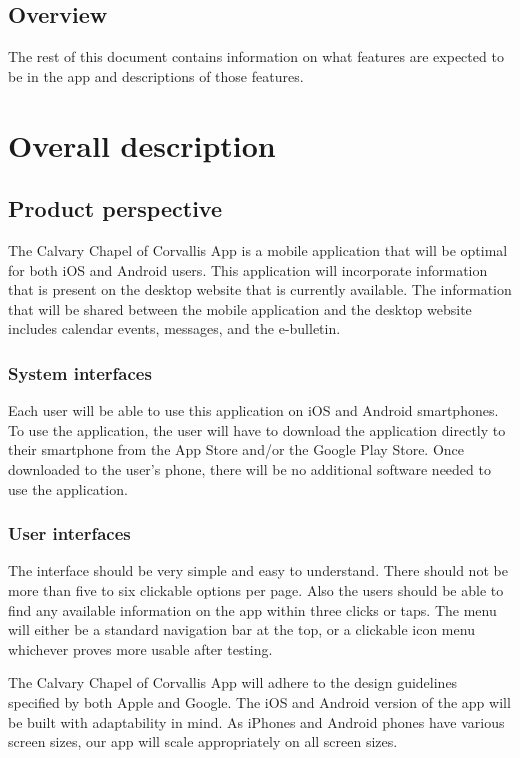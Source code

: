 \documentclass[letterpaper,10pt,draftclsnofoot,onecolumn,titlepage]{IEEEtran}
\begin{document}
	\subsection{Overview}
	 The rest of this document contains information on what features are expected to be in the app and descriptions of those features.

	\section{Overall description}
	\subsection{Product perspective}
	The Calvary Chapel of Corvallis App is a mobile application that will be optimal for both iOS and Android users.
	This application will incorporate information that is present on the desktop website that is currently available.
	The information that will be shared between the mobile application and the desktop website includes calendar events, messages, and the e-bulletin.

	\subsubsection{System interfaces}
	Each user will be able to use this application on iOS and Android smartphones.
	To use the application, the user will have to download the application directly to their smartphone from the App Store and/or the Google Play Store.
	Once downloaded to the user's phone, there will be no additional software needed to use the application.

	\subsubsection{User interfaces}
	The interface should be very simple and easy to understand.
	There should not be more than five to six clickable options per page.
	Also the users should be able to find any available information on the app within three clicks or taps.
	The menu will either be a standard navigation bar at the top, or a clickable icon menu whichever proves more usable after testing.

	The Calvary Chapel of Corvallis App will adhere to the design guidelines specified by both Apple and Google.
	The iOS and Android version of the app will be built with adaptability in mind.
	As iPhones and Android phones have various screen sizes, our app will scale appropriately on all screen sizes.
\end{document}
